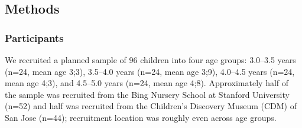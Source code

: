 \documentclass[man]{apa2}
\begin{document}



\subsection{Methods}

\subsubsection{Participants}

We recruited a planned sample of 96 children into four age groups: 3.0--3.5 years (n=24, mean age 3;3), 3.5--4.0 years (n=24, mean age 3;9), 4.0--4.5 years (n=24, mean age 4;3), and 4.5--5.0 years (n=24, mean age 4;8).  Approximately half of the sample was recruited from the Bing Nursery School at Stanford University (n=52) and half was recruited from the Children's Discovery Museum (CDM) of San Jose (n=44); recruitment location was roughly even across age groups.
  
\end{document}
